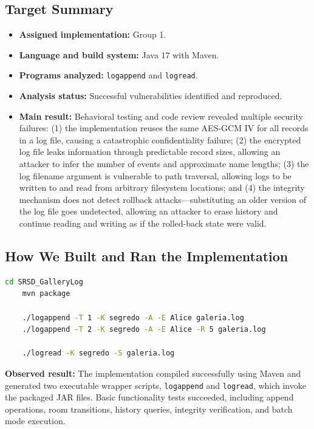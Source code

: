 \documentclass[a4paper, 12pt]{article}
\begin{document}
    \subsection{Target Summary}
    \begin{itemize}
        \item \textbf{Assigned implementation:} Group 1.
        \item \textbf{Language and build system:} Java 17 with Maven.
        \item \textbf{Programs analyzed:} \texttt{logappend} and \texttt{logread}.
        \item \textbf{Analysis status:} Successful vulnerabilities identified and reproduced.
        \item \textbf{Main result:} Behavioral testing and code review revealed multiple security failures: (1) the implementation reuses the same AES-GCM IV for all records in a log file, causing a catastrophic confidentiality failure; (2) the encrypted log file leaks information through predictable record sizes, allowing an attacker to infer the number of events and approximate name lengths; (3) the log filename argument is vulnerable to path traversal, allowing logs to be written to and read from arbitrary filesystem locations; and (4) the integrity mechanism does not detect rollback attacks---substituting an older version of the log file goes undetected, allowing an attacker to erase history and continue reading and writing as if the rolled-back state were valid.
    \end{itemize}

    \subsection{How We Built and Ran the Implementation}
    \begin{lstlisting}[language=bash]
    cd SRSD_GalleryLog
    mvn package

    ./logappend -T 1 -K segredo -A -E Alice galeria.log
    ./logappend -T 2 -K segredo -A -E Alice -R 5 galeria.log

    ./logread -K segredo -S galeria.log
    \end{lstlisting}

    \noindent\textbf{Observed result:}
    The implementation compiled successfully using Maven and generated two executable wrapper scripts, \texttt{logappend} and \texttt{logread}, which invoke the packaged JAR files. Basic functionality tests succeeded, including append operations, room transitions, history queries, integrity verification, and batch mode execution.
\end{document}

